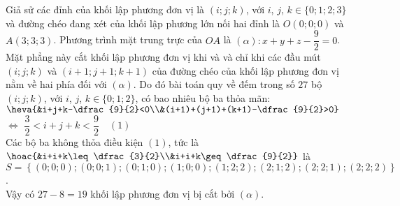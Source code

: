 \begin{ex}
{\begin{center}
		\end{center}		
		Giả sử các đỉnh của khối lập phương đơn vị là $(i;j;k)$, với $i$, $j$, $k\in\{0;1;2;3\}$ và đường chéo đang xét của khối lập phương lớn nối hai đỉnh là $O(0;0;0)$ và $A(3;3;3)$. Phương trình mặt trung trực của $OA$ là $(\alpha)\colon x+y+z-\dfrac{9}{2}=0$. Mặt phẳng này cắt khối lập phương đơn vị khi và và chỉ khi các đầu mút $(i;j;k)$ và $(i+1;j+1;k+1)$ của đường chéo của khối lập phương đơn vị nằm về hai phía đối với $(\alpha)$. Do đó bài toán quy về đếm trong số $27$ bộ $(i;j;k)$, với $i$, $j$, $k\in\{0;1;2\}$, có bao nhiêu bộ ba thỏa mãn:\\
		$\heva{&i+j+k-\dfrac{9}{2}<0\\&(i+1)+(j+1)+(k+1)-\dfrac{9}{2}>0}$ $ \Leftrightarrow $ $\dfrac{3}{2}<i+j+k<\dfrac{9}{2}\quad(1)$\\
		Các bộ ba không thỏa điều kiện $(1)$, tức là $\hoac{&i+i+k\leq\dfrac{3}{2}\\&i+i+k\geq\dfrac{9}{2}}$ là\\
		$S=\left\{ (0;0;0);(0;0;1);(0;1;0);(1;0;0);(1;2;2);(2;1;2);(2;2;1);(2;2;2) \right\} $.\\
		Vậy có $27-8=19$ khối lập phương đơn vị bị cắt bởi $(\alpha)$.
	}
\end{ex}
